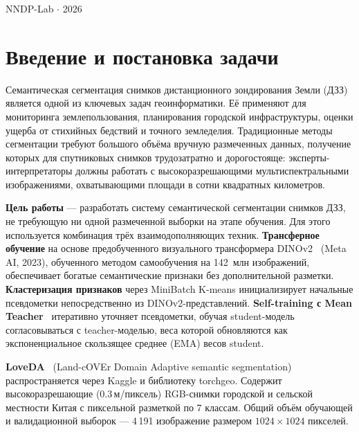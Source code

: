 \documentclass[11pt,a4paper]{article}
\begin{document}
\vfill
\begin{center}
  \small\color{midgray}NNDP-Lab $\cdot$ 2026
\end{center}

\newpage

\tableofcontents
\newpage

\section{Введение и постановка задачи}

Семантическая сегментация снимков дистанционного зондирования Земли (ДЗЗ) является
одной из ключевых задач геоинформатики. Её применяют для мониторинга землепользования,
планирования городской инфраструктуры, оценки ущерба от стихийных бедствий и точного
земледелия. Традиционные методы сегментации требуют большого объёма вручную размеченных
данных, получение которых для спутниковых снимков трудозатратно и дорогостояще:
эксперты-интерпретаторы должны работать с высокоразрешающими мультиспектральными
изображениями, охватывающими площади в сотни квадратных километров.

\textbf{Цель работы} — разработать систему семантической сегментации снимков ДЗЗ,
не требующую ни одной размеченной выборки на этапе обучения. Для этого используется
комбинация трёх взаимодополняющих техник. \textbf{Трансферное обучение} на основе
предобученного визуального трансформера DINOv2~\cite{oquab2024dinov2} (Meta AI, 2023),
обученного методом самообучения на 142~млн изображений, обеспечивает богатые
семантические признаки без дополнительной разметки. \textbf{Кластеризация признаков}
через MiniBatch K-means инициализирует начальные псевдометки непосредственно из
DINOv2-представлений. \textbf{Self-training с Mean Teacher}~\cite{tarvainen2017mean}
итеративно уточняет псевдометки, обучая student-модель согласовываться с teacher-моделью,
веса которой обновляются как экспоненциальное скользящее среднее (EMA) весов student.

\begin{infobox}[Датасет]
  \textbf{LoveDA}~\cite{wang2021loveda} (Land-cOVEr Domain Adaptive semantic segmentation)
  распространяется через Kaggle и библиотеку torchgeo. Содержит высокоразрешающие
  (0.3\,м/пиксель) RGB-снимки городской и сельской местности Китая с пиксельной
  разметкой по 7 классам. Общий объём обучающей и валидационной выборок — 4\,191
  изображение размером $1024 \times 1024$ пикселей.
\end{infobox}
\end{document}
